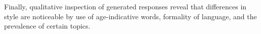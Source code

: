 Finally, qualitative inspection of generated responses reveal that differences in style are noticeable by use of age-indicative words, formality of language, and the prevalence of certain topics.

